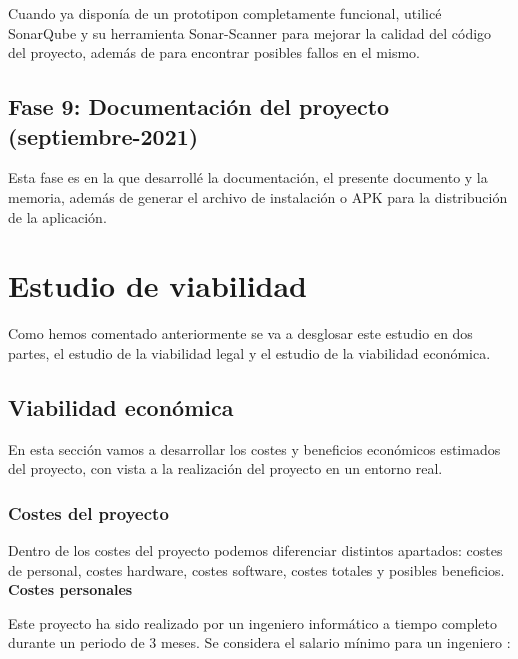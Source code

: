 Cuando ya disponía de un prototipon completamente funcional, utilicé SonarQube y su herramienta Sonar-Scanner para mejorar la calidad del código del proyecto, además de para encontrar posibles fallos en el mismo.

\subsection{Fase 9: Documentación del proyecto (septiembre-2021)}

Esta fase es en la que desarrollé la documentación, el presente documento y la memoria,
además de generar el archivo de instalación o APK para la distribución de la aplicación.



\section{Estudio de viabilidad}

Como hemos comentado anteriormente se va a desglosar este estudio en dos partes, el estudio de la viabilidad legal y el estudio de la viabilidad económica.

\subsection{Viabilidad económica}

En esta sección vamos a desarrollar los costes y beneficios económicos estimados del proyecto, con vista a la realización del proyecto en un entorno real.

\subsubsection{Costes del proyecto}

Dentro de los costes del proyecto podemos diferenciar distintos apartados: costes de personal, costes hardware, costes software, costes totales y posibles beneficios.\\

\textbf{Costes personales}

Este proyecto ha sido realizado por un ingeniero informático a tiempo completo durante un periodo de 3 meses. Se considera el salario mínimo para un ingeniero \cite{salariogob}:

